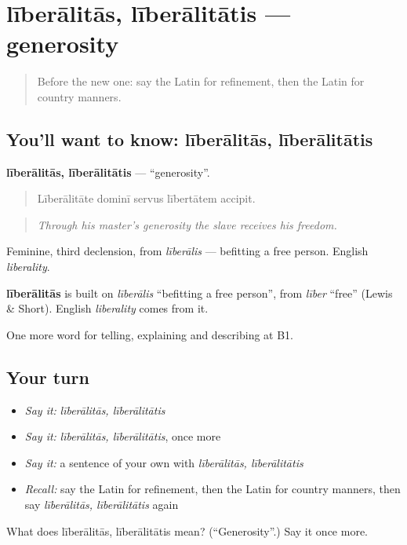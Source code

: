 \section[līberālitās, līberālitātis]{līberālitās, līberālitātis — generosity}

\label{lesson:LA-C506-liberalitas}



\begin{quote}
Before the new one: say the Latin for refinement, then the Latin for country manners.
\end{quote}

\subsection*{You'll want to know: līberālitās, līberālitātis}
\textbf{līberālitās, līberālitātis} — \textquotedblleft{}generosity\textquotedblright{}.

\begin{quote}
Līberālitāte dominī servus lībertātem accipit.
\end{quote}

\begin{quote}
\emph{Through his master's generosity the slave receives his freedom.}
\end{quote}

Feminine, third declension, from \emph{līberālis} — befitting a free person. English \emph{liberality}.

\begin{cousinweb}
\textbf{līberālitās} is built on \emph{līberālis} \textquotedblleft{}befitting a free person\textquotedblright{}, from \emph{līber} \textquotedblleft{}free\textquotedblright{} (Lewis \& Short). English \emph{liberality} comes from it.
\end{cousinweb}

\begin{grammarlens}[title={What you've built}]
One more word for telling, explaining and describing at B1.
\end{grammarlens}

\subsection*{Your turn}
\begin{itemize}
\raggedright
  \item \emph{Say it:} \emph{līberālitās, līberālitātis}
  \item \emph{Say it:} \emph{līberālitās, līberālitātis}, once more
  \item \emph{Say it:} a sentence of your own with \emph{līberālitās, līberālitātis}
  \item \emph{Recall:} say the Latin for refinement, then the Latin for country manners, then say \emph{līberālitās, līberālitātis} again
\end{itemize}

\begin{tcolorbox}[breakable,colback=teal!4,colframe=teal!35!black,title={Before you move on}]
What does līberālitās, līberālitātis mean? (\textquotedblleft{}Generosity\textquotedblright{}.) Say it once more.
\end{tcolorbox}
